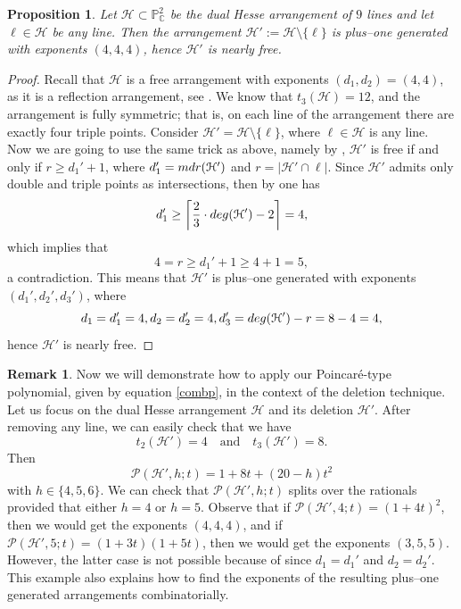 \documentclass[12pt]{article}
\theoremstyle{plain}
\newtheorem{proposition}[thm]{Proposition}
\theoremstyle{definition}
\newtheorem{remark}[thm]{Remark}
\begin{document}
\begin{proposition}
Let $\mathcal{H} \subset \mathbb{P}^{2}_{\mathbb{C}}$ be the dual Hesse arrangement of $9$ lines and let $\ell \in \mathcal{H}$ be any line. Then the arrangement $\mathcal{H}' := \mathcal{H} \setminus \{\ell\}$ is plus--one generated with exponents $(4,4,4)$, hence $\mathcal{H}'$ is nearly free.
\end{proposition}
\begin{proof}
Recall that $\mathcal{H}$ is a free arrangement with exponents $(d_{1}, d_{2}) = (4, 4)$, as it is a reflection arrangement, see \cite[Chapter 6]{OT92}. We know that $t_3(\mathcal{H})=12$, and the arrangement is fully symmetric; that is, on each line of the arrangement there are exactly four triple points. Consider $\mathcal{H}' = \mathcal{H} \setminus \{\ell\}$, where $\ell \in \mathcal{H}$ is any line. Now we are going to use the same trick as above, namely by \cite[Theorem 1.3 (3)]{POG}, $\mathcal{H}'$ is free if and only if $r \geq d_{1}' + 1$, where $d_{1}' = {\rm mdr}(\mathcal{H}')$ and $r = |\mathcal{H}' \cap \ell|$.
Since $\mathcal{H}'$ admits only double and triple points as intersections, then by \cite[Theorem 2.1]{Dimca1} one has
$$d_{1}' \geq \bigg\lceil\frac{2}{3}\cdot {\rm deg}(\mathcal{H}')-2 \bigg\rceil = 4,$$
which implies that
$$4 = r \geq d_{1}' + 1 \geq 4 + 1 = 5,$$
a contradiction. This means that $\mathcal{H}'$ is plus--one generated with exponents $(d_{1}',d_{2}',d_{3}')$, where
$$d_{1} =d_{1}'= 4, d_{2} = d_{2}'= 4, d_{3}' = {\rm deg}(\mathcal{H}')-r = 8 - 4 = 4,$$
hence $\mathcal{H}'$ is nearly free.
\end{proof}
\begin{remark}
\label{pp1}
Now we will demonstrate how to apply our Poincar\'e-type polynomial, given by equation \eqref{combp}, in the context of the deletion technique. Let us focus on the dual Hesse arrangement $\mathcal{H}$ and its deletion $\mathcal{H}'$.
After removing any line, we can easily check that we have
$$t_{2}(\mathcal{H}')=4\quad \text{and}\quad t_{3}(\mathcal{H}')=8.$$
Then
$$\mathcal{P}(\mathcal{H}', h;t) = 1 + 8t + (20-h)t^2$$
with $h \in \{4,5,6\}$. We can check that $\mathcal{P}(\mathcal{H}', h;t)$ splits over the rationals provided that either $h=4$ or $h=5$. Observe that if $\mathcal{P}(\mathcal{H}', 4;t) = (1+4t)^2$, then we would get the exponents $(4,4,4)$, and if $\mathcal{P}(\mathcal{H}', 5;t) = (1+3t)(1+5t)$, then we would get the exponents $(3,5,5)$. However, the latter case is not possible because of \cite[Theorem 1.3 (3)]{POG} since $d_1=d_1'$ and $d_2=d_2'$. This example also explains how to find the exponents of the resulting plus--one generated arrangements combinatorially.
\end{remark}
\end{document}
